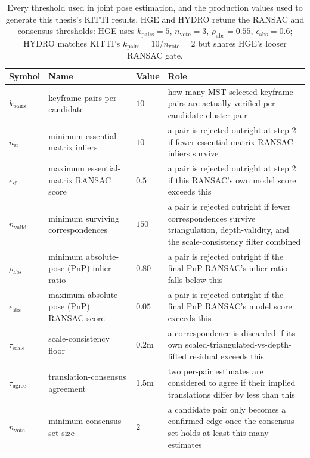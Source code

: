 \begin{table}[htb]
  \centering
  \begin{tabular*}{\textwidth}{@{\extracolsep{\fill}} lllp{6.3cm}}
  \hline
  \textbf{Symbol} & \textbf{Name} & \textbf{Value} & \textbf{Role} \\
  \hline
  $k_{\mathrm{pairs}}$ & keyframe pairs per candidate & $10$ &
    how many MST-selected keyframe pairs are actually verified per candidate cluster pair \\
  $n_{\mathrm{sf}}$ & minimum essential-matrix inliers & $10$ &
    a pair is rejected outright at step 2 if fewer essential-matrix RANSAC inliers survive \\
  $\epsilon_{\mathrm{sf}}$ & maximum essential-matrix RANSAC score & $0.5$ &
    a pair is rejected outright at step 2 if this RANSAC's own model score exceeds this \\
  $n_{\mathrm{valid}}$ & minimum surviving correspondences & $150$ &
    a pair is rejected outright if fewer correspondences survive triangulation,
    depth-validity, and the scale-consistency filter combined \\
  $\rho_{\mathrm{abs}}$ & minimum absolute-pose (PnP) inlier ratio & $0.80$ &
    a pair is rejected outright if the final PnP RANSAC's inlier ratio falls below this \\
  $\epsilon_{\mathrm{abs}}$ & maximum absolute-pose (PnP) RANSAC score & $0.05$ &
    a pair is rejected outright if the final PnP RANSAC's model score exceeds this \\
  $\tau_{\mathrm{scale}}$ & scale-consistency floor & $0.2$m &
    a correspondence is discarded if its own scaled-triangulated-vs-depth-lifted residual
    exceeds this \\
  $\tau_{\mathrm{agree}}$ & translation-consensus agreement & $1.5$m &
    two per-pair estimates are considered to agree if their implied translations differ by
    less than this \\
  $n_{\mathrm{vote}}$ & minimum consensus-set size & $2$ &
    a candidate pair only becomes a confirmed edge once the consensus set holds at least this
    many estimates \\
  \hline
  \end{tabular*}
  \caption[Pose-estimation thresholds]{Every threshold used in joint pose estimation, and the
    production values used to generate this thesis's KITTI results. HGE and HYDRO retune the
    RANSAC and consensus thresholds: HGE uses $k_{\mathrm{pairs}}=5$, $n_{\mathrm{vote}}=3$,
    $\rho_{\mathrm{abs}}=0.55$, $\epsilon_{\mathrm{abs}}=0.6$; HYDRO matches KITTI's
    $k_{\mathrm{pairs}}=10$/$n_{\mathrm{vote}}=2$ but shares HGE's looser RANSAC gate.}
  \label{tab:method-pose-estimation-thresholds}
\end{table}


